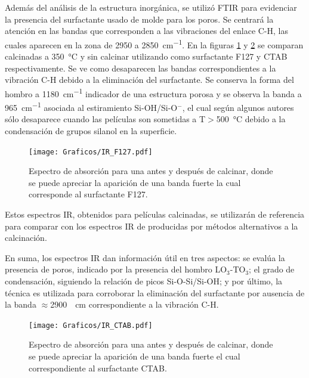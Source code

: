 		 Además del análisis de la estructura inorgánica, se utilizó FTIR para evidenciar la presencia del surfactante usado de molde para los poros. Se centrará la atención en las bandas que corresponden a las vibraciones del enlace C-H, las cuales aparecen en la zona de 2950 a \SI{2850}{\cm^{-1}}. En la figuras \ref{fig:IR_F127_calciando} y \ref{fig:IR_CTAB_calcinado} se comparan \pdm\space calcinadas a \SI{350}{\celsius} y sin calcinar utilizando como surfactante F127 y CTAB respectivamente. Se ve como desaparecen las bandas correspondientes a la vibración C-H debido a la eliminación del surfactante. Se conserva la forma del hombro a \SI{1180}{\cm^{-1}} indicador de una estructura porosa y se observa la banda a \SI{965}{\cm^{-1}} asociada al estiramiento Si-OH/Si-O$^-$, el cual según algunos autores sólo desaparece cuando las películas son sometidas a T$>$\SI{500}{\celsius} debido a la condensación de grupos silanol en la superficie.\cite{Innocenzi2003,Almeida1990,Bertoluzza1982}

				\begin{figure}[b!]
						\begin{center}
						\texttt{[image: Graficos/IR\_F127.pdf]}
						\caption[FTIR para una \pdmF.]{Espectro de absorción para una \pdmF\space antes y después de calcinar, donde se puede apreciar la aparición de una banda fuerte la cual corresponde al surfactante F127.}
						\label{fig:IR_F127_calciando}
						\end{center}
						\end{figure}
			 
		  Estos espectros IR, obtenidos para películas calcinadas, se utilizarán de referencia para comparar con los espectros IR de \pdm\space producidas por métodos alternativos a la calcinación. 

		  \pagebreak En suma, los espectros IR dan información útil en tres aspectos: se evalúa la presencia de poros, indicado por la presencia del hombro LO$_3$-TO$_3$; el grado de condensación, siguiendo la relación de picos Si-O-Si/Si-OH; y por último, la técnica es utilizada para corroborar la eliminación del surfactante por ausencia de la banda $\approx$\SI{2900}{\per\cm} correspondiente a la vibración C-H.

		  		\begin{figure}[h!]
						\begin{center}
						\texttt{[image: Graficos/IR\_CTAB.pdf]}
						\caption[FTIR para una \pdmC.]{Espectro de absorción para una \pdmC\space antes y después de calcinar, donde se puede apreciar la aparición de una banda fuerte el cual correspondiente al surfactante CTAB.}
						\label{fig:IR_CTAB_calcinado}
						\end{center}
						\end{figure}

